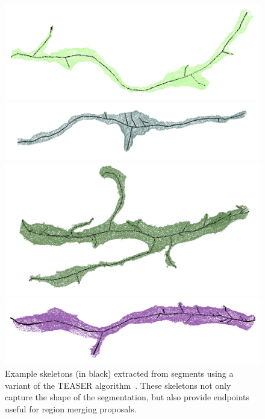 \begin{figure}[t]
	\centering
	\begin{minipage}{0.45\linewidth}
		\includegraphics[width=\linewidth]{./figures/skeleton1.png}		
	\end{minipage}
	\hfill
	\begin{minipage}{0.45\linewidth}
		\includegraphics[width=\linewidth]{./figures/skeleton2.png}		
	\end{minipage}
	\begin{minipage}{0.45\linewidth}
		\includegraphics[width=\linewidth]{./figures/skeleton3.png}		
	\end{minipage}
	\hfill
	\begin{minipage}{0.45\linewidth}
		\includegraphics[width=\linewidth]{./figures/skeleton4.png}		
	\end{minipage}
	\caption{Example skeletons (in black) extracted from segments using a variant of the TEASER algorithm~\cite{sato2000teasar}. These skeletons not only capture the shape of the segmentation, but also provide endpoints useful for region merging proposals.}
	\label{fig:skeletonization}
\end{figure}

